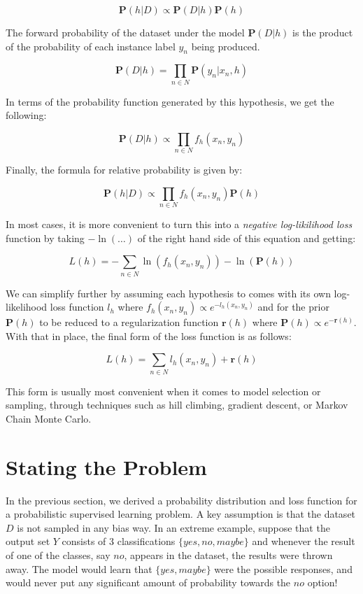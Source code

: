 \documentclass[twoside]{article}
\begin{document}
\[\mathbf{P}(h|D)\propto\mathbf{P}(D|h)\mathbf{P}(h)\]

The forward probability of the dataset under the model \(\mathbf{P}(D|h)\) is the product of the probability of each instance label \(y_n\) being produced.

\[\mathbf{P}(D|h)=\prod_{n \in N} \mathbf{P}(y_n|x_n,h)\]

In terms of the probability function generated by this hypothesis, we get the following:

\[\mathbf{P}(D|h)\propto \prod_{n \in N} f_h(x_n,y_n)\]

Finally, the formula for relative probability is given by: 

\[\mathbf{P}(h|D)\propto\prod_{n \in N} f_h(x_n,y_n)\mathbf{P}(h)\]

In most cases, it is more convenient to turn this into a \textit{negative log-likilihood loss} function by taking \(-\ln(\ldots)\) of the right hand side of this equation and getting:

\[L(h)=-\sum_{n \in N} \ln(f_h(x_n,y_n))-\ln(\mathbf{P}(h))\]

We can simplify further by assuming each hypothesis to comes with its own log-likelihood loss function \(l_h\) where \(f_h(x_n,y_n)\propto e^{-l_h(x_n,y_n)}\) and for the prior \(\mathbf{P}(h)\) to be reduced to a regularization function \(\mathbf{r}(h)\) where \(\mathbf{P}(h)\propto e^{-\mathbf{r}(h)}\). With that in place, the final form of the loss function is as follows:

\[L(h)=\sum_{n \in N} l_h(x_n,y_n)+\mathbf{r}(h)\]

This form is usually most convenient when it comes to model selection or sampling, through techniques such as hill climbing, gradient descent, or Markov Chain Monte Carlo.

\section{Stating the Problem}

In the previous section, we derived a probability distribution and loss function for a probabilistic supervised learning problem. A key assumption is that the dataset \(D\) is not sampled in any bias way. In an extreme example, suppose that the output set \(Y\) consists of 3 classifications \(\{yes, no, maybe\}\) and whenever the result of one of the classes, say \(no\), appears in the dataset, the results were thrown away. The model would learn that \(\{yes, maybe\}\) were the possible responses, and would never put any significant amount of probability towards the \(no\) option!
\end{document}
